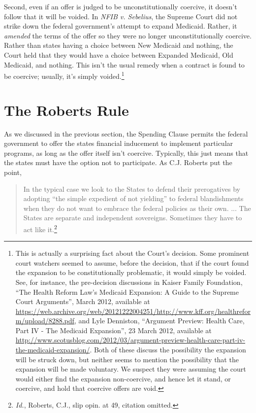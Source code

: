\documentclass[
  11pt,
  letterpaper,
  DIV=11,
  numbers=noendperiod,
  twoside]{scrartcl}
\begin{document}
Second, even if an offer is judged to be unconstitutionally coercive, it
doesn't follow that it will be voided. In \emph{NFIB v. Sebelius}, the
Supreme Court did not strike down the federal government's attempt to
expand Medicaid. Rather, it \emph{amended} the terms of the offer so
they were no longer unconstitutionally coercive. Rather than states
having a choice between New Medicaid and nothing, the Court held that
they would have a choice between Expanded Medicaid, Old Medicaid, and
nothing. This isn't the usual remedy when a contract is found to be
coercive; usually, it's simply voided.\footnote{This is actually a
  surprising fact about the Court's decision. Some prominent court
  watchers seemed to assume, before the decision, that if the court
  found the expansion to be constitutionally problematic, it would
  simply be voided. See, for instance, the pre-decision discussions in
  Kaiser Family Foundation, ``The Health Reform Law's Medicaid
  Expansion: A Guide to the Supreme Court Arguments'', March 2012,
  available at
  \url{https://web.archive.org/web/20121222004251/http://www.kff.org/healthreform/upload/8288.pdf},
  and Lyle Denniston, ``Argument Preview: Health Care, Part IV - The
  Medicaid Expansion'', 23 March 2012, available at
  \url{http://www.scotusblog.com/2012/03/argument-preview-health-care-part-iv-the-medicaid-expansion/}.
  Both of these discuss the possibility the expansion will be struck
  down, but neither seems to mention the possibility that the expansion
  will be made voluntary. We suspect they were assuming the court would
  either find the expansion non-coercive, and hence let it stand, or
  coercive, and hold that coercive offers are void.}

\section{The Roberts Rule}\label{the-roberts-rule}

As we discussed in the previous section, the Spending Clause permits the
federal government to offer the states financial inducement to implement
particular programs, as long as the offer itself isn't coercive.
Typically, this just means that the states must have the option not to
participate. As C.J. Roberts put the point,

\begin{quote}
In the typical case we look to the States to defend their prerogatives
by adopting ``the simple expedient of not yielding'' to federal
blandishments when they do not want to embrace the federal policies as
their own. ... The States are separate and independent sovereigns.
Sometimes they have to act like it.\footnote{\emph{Id.}, Roberts, C.J.,
  slip opin. at 49, citation omitted.}
\end{quote}
\end{document}
